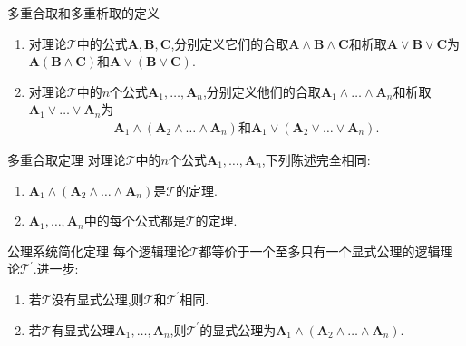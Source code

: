 \begin{definition}{多重合取和多重析取的定义}{}
	\begin{enumerate}
		\item 对理论$\mathcal{T}$中的公式$\boldsymbol{A},\boldsymbol{B},\boldsymbol{C}$,分别定义它们的合取$\boldsymbol{A}\wedge\boldsymbol{B}\wedge\boldsymbol{C}$和析取$\boldsymbol{A}\vee\boldsymbol{B}\vee\boldsymbol{C}$为$\boldsymbol{A}\left(\boldsymbol{B}\wedge\boldsymbol{C}\right)$和$\boldsymbol{A}\vee\left(\boldsymbol{B}\vee\boldsymbol{C}\right)$.
		\item 对理论$\mathcal{T}$中的$n$个公式$\boldsymbol{A}_{1},\ldots,\boldsymbol{A}_{n}$,分别定义他们的合取$\boldsymbol{A}_{1}\wedge\ldots\wedge\boldsymbol{A}_{n}$和析取$\boldsymbol{A}_{1}\vee\ldots\vee\boldsymbol{A}_{n}$为
		\begin{align*}
			\boldsymbol{A}_{1}\wedge\left(\boldsymbol{A}_{2}\wedge\ldots\wedge\boldsymbol{A}_{n}\right)\text{和}\boldsymbol{A}_{1}\vee\left(\boldsymbol{A}_{2}\vee\ldots\vee\boldsymbol{A}_{n}\right).
		\end{align*}
	\end{enumerate}
\end{definition}

\begin{metatheorem}{多重合取定理}{}
	对理论$\mathcal{T}$中的$n$个公式$\boldsymbol{A}_{1},\ldots,\boldsymbol{A}_{n}$,下列陈述完全相同:
	\begin{enumerate}
		\item $\boldsymbol{A}_{1}\wedge\left(\boldsymbol{A}_{2}\wedge\ldots\wedge\boldsymbol{A}_{n}\right)$是$\mathcal{T}$的定理.
		\item $\boldsymbol{A}_{1},\ldots,\boldsymbol{A}_{n}$中的每个公式都是$\mathcal{T}$的定理.
	\end{enumerate}
\end{metatheorem}

\begin{metatheorem}{公理系统简化定理}{}
	每个逻辑理论$\mathcal{T}$都等价于一个至多只有一个显式公理的逻辑理论$\mathcal{T}^{\prime}$.进一步:
	\begin{enumerate}
		\item 若$\mathcal{T}$没有显式公理,则$\mathcal{T}$和$\mathcal{T}^{\prime}$相同.
		\item 若$\mathcal{T}$有显式公理$\boldsymbol{A}_{1},\ldots,\boldsymbol{A}_{n}$,则$\mathcal{T}^{\prime}$的显式公理为$\boldsymbol{A}_{1}\wedge\left(\boldsymbol{A}_{2}\wedge\ldots\wedge\boldsymbol{A}_{n}\right)$.
	\end{enumerate}
\end{metatheorem}

